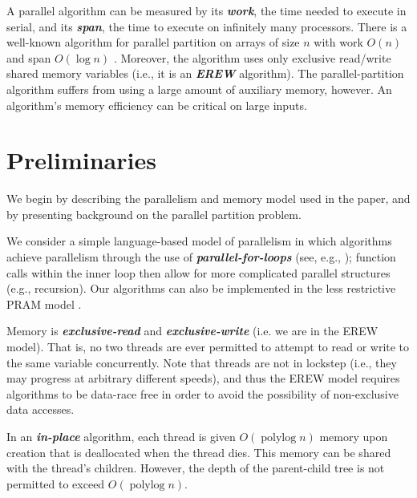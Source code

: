 \documentclass[sigconf, 10pt, nonacm]{acmart}
\newcommand{\polylog}{\operatorname{polylog}}
\newcommand{\defn}[1]{{\textit{\textbf{\boldmath #1}}}}
\renewcommand{\paragraph}[1]{\vspace{0.09in}\noindent{\bf \boldmath #1.}}
\theoremstyle{remark}
\theoremstyle{remark}
\begin{document}
A parallel algorithm can be measured by its \defn{work}, the time
needed to execute in serial, and its \defn{span}, the time to execute
on infinitely many processors. There is a well-known algorithm for
parallel partition on arrays of size $n$ with work $O(n)$ and span
$O(\log n)$ \cite{Blelloch96,AcarBl16}. Moreover, the algorithm uses
only exclusive read/write shared memory variables (i.e., it is an
\defn{EREW} algorithm).
The parallel-partition algorithm suffers from using a large amount of
auxiliary memory, however.
An algorithm's memory efficiency can be critical on large inputs.

\section{Preliminaries}\label{secprelim}

We begin by describing the parallelism and memory model used in
the paper, and by presenting background on the parallel partition problem.

\paragraph{Workflow Model} We consider a simple language-based model of parallelism in which algorithms achieve parallelism through the use of \defn{parallel-for-loops} (see, e.g.,
\cite{Blelloch96,AcarBl16,CLRS}); function calls within the inner loop
then allow for more complicated parallel structures (e.g., recursion). Our algorithms can also be implemented in the less restrictive PRAM model \cite{Blelloch96, AcarBl16}.

\paragraph{Memory Model}
Memory is \defn{exclusive-read} and \defn{exclusive-write} (i.e. we are in the
EREW model). That is, no two threads are ever permitted to attempt to read or
write to the same variable concurrently. Note that threads are not in lockstep
(i.e., they may progress at arbitrary different speeds), and thus the EREW
model requires algorithms to be data-race free in order to avoid the
possibility of non-exclusive data accesses.

In an \defn{in-place} algorithm, each thread is given $O(\polylog n)$
memory upon creation that is deallocated when the thread dies. This
memory can be shared with the thread's children. However, the depth of
the parent-child tree is not permitted to exceed $O(\polylog n)$.
\end{document}
